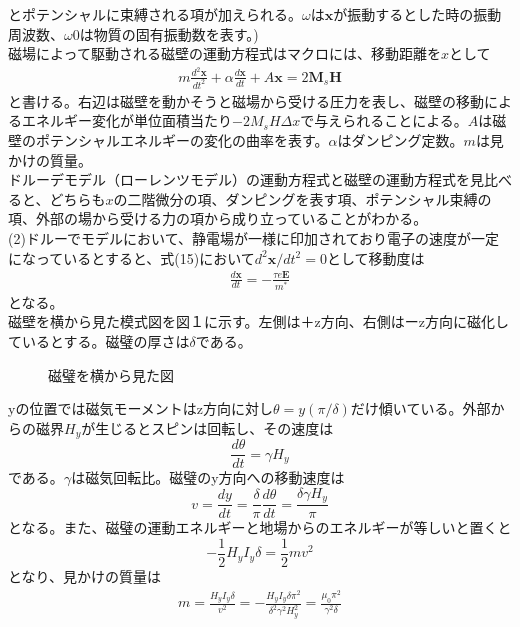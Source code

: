 \documentclass{jsarticle}
\begin{document}
とポテンシャルに束縛される項が加えられる。$\omega$は$\bm{x}$が振動するとした時の振動周波数、$\omega0$は物質の固有振動数を表す。)\\
\quad 磁場によって駆動される磁壁の運動方程式はマクロには、移動距離を$x$として
\begin{eqnarray}
m\frac{d^2\bm{x}}{dt^2}+\alpha\frac{d\bm{x}}{dt}+A \bm{x}=2\bm{M}_s\bm{H}
\end{eqnarray}
と書ける。右辺は磁壁を動かそうと磁場から受ける圧力を表し、磁壁の移動によるエネルギー変化が単位面積当たり$-2M_sH\Delta x$で与えられることによる。$A$は磁壁のポテンシャルエネルギーの変化の曲率を表す。$\alpha$はダンピング定数。$m$は見かけの質量。\\
\quad ドルーデモデル（ローレンツモデル）の運動方程式と磁壁の運動方程式を見比べると、どちらも$x$の二階微分の項、ダンピングを表す項、ポテンシャル束縛の項、外部の場から受ける力の項から成り立っていることがわかる。\\
(2)ドルーでモデルにおいて、静電場が一様に印加されており電子の速度が一定になっているとすると、式(15)において$d^2\bm{x}/dt^2=0$として移動度は
\begin{eqnarray}
\frac{d\bm{x}}{dt}=-\frac{\tau e \bm{E}}{m^\ast}
\end{eqnarray}
となる。\\
\quad 磁壁を横から見た模式図を図１に示す。左側は＋z方向、右側はーz方向に磁化しているとする。磁璧の厚さは$\delta$である。
\begin{figure}[htbp]
\begin{center}
 \end{center}
 \caption{磁璧を横から見た図}
 \label{fig:one}
\end{figure}
yの位置では磁気モーメントはz方向に対し$\theta=y(\pi/\delta)$だけ傾いている。外部からの磁界$H_y$が生じるとスピンは回転し、その速度は
\begin{equation}
\frac{d\theta}{dt}=\gamma H_y
\end{equation}
である。$\gamma$は磁気回転比。磁璧のy方向への移動速度は
\begin{equation}
v=\frac{dy}{dt}=\frac{\delta}{\pi}\frac{d\theta}{dt}=\frac{\delta\gamma H_y}{\pi}
\end{equation}
となる。また、磁璧の運動エネルギーと地場からのエネルギーが等しいと置くと
\begin{equation}
-\frac{1}{2}H_yI_y\delta=\frac{1}{2}mv^2
\end{equation}
となり、見かけの質量は
\begin{eqnarray}
m=\frac{H_yI_y\delta}{v^2}=-\frac{H_yI_y\delta\pi^2}{\delta^2\gamma^2H_y^2}=\frac{\mu_0\pi^2}{\gamma^2\delta}
\end{eqnarray}
\end{document}
